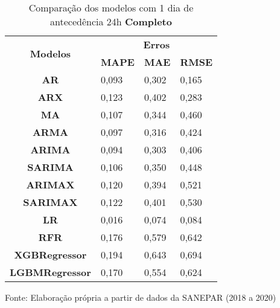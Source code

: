 \begin{table}[H]
	\centering
	\caption{Comparação dos modelos com 1 dia de antecedência 24h \textbf{Completo} }\label{tb:1-24cm}
	\begin{tabular}{@{}clll@{}}
		\toprule
		\multirow{2}{*}{\textbf{Modelos}} & \multicolumn{3}{c}{\textbf{Erros}}                                                                       \\ \cmidrule(l){2-4} 
		& \multicolumn{1}{c}{\textbf{MAPE}} & \multicolumn{1}{c}{\textbf{MAE}} & \multicolumn{1}{c}{\textbf{RMSE}} \\ \hline
\textbf{AR}                       & 0,093                             & 0,302                            & 0,165                             \\
\textbf{ARX}                      & 0,123                             & 0,402                            & 0,283                             \\
\textbf{MA}                       & 0,107                             & 0,344                            & 0,460                             \\
\textbf{ARMA}                     & 0,097                             & 0,316                            & 0,424                             \\
\textbf{ARIMA}                    & 0,094                             & 0,303                            & 0,406                             \\
\textbf{SARIMA}                   & 0,106                             & 0,350                            & 0,448                             \\
\textbf{ARIMAX}                   & 0,120                             & 0,394                            & 0,521                             \\
\textbf{SARIMAX}                  & 0,122                             & 0,401                            & 0,530                             \\
\textbf{LR}                       & 0,016                             & 0,074                            & 0,084                             \\
\textbf{RFR}                      & 0,176                             & 0,579                            & 0,642                             \\
\textbf{XGBRegressor}             & 0,194                             & 0,643                            & 0,694                             \\
\textbf{LGBMRegressor}            & 0,170                             & 0,554                            & 0,624                             \\ \bottomrule
	\end{tabular}

Fonte: Elaboração própria a partir de dados da SANEPAR (2018 a 2020)
\end{table}


